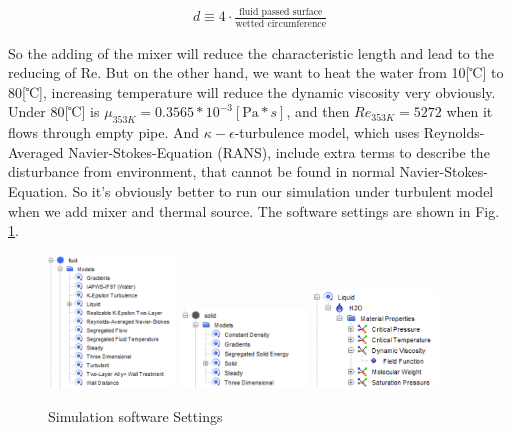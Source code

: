 \documentclass[journal,article,submit,moreauthors,pdftex]{Definitions/mdpi}
\begin{document}
\begin{align*}
    d \equiv 4 \cdot \frac{\text{fluid passed surface}}{\text{wetted circumference}}
\end{align*}

So the adding of the mixer will reduce the characteristic length and lead to the reducing of Re. But on the other hand, we want to heat the water from 10[℃] to 80[℃], increasing temperature will reduce the dynamic viscosity very obviously. Under 80[℃] is  $\mu_{353K}=0.3565*10^{-3}[\text{Pa}*s]$, and then $Re_{353K}=5272$ when it flows through empty pipe. And $\kappa-\epsilon$-turbulence model, which uses Reynolds-Averaged Navier-Stokes-Equation (RANS), include extra terms to describe the disturbance from environment, that cannot be found in normal Navier-Stokes-Equation. So it's obviously better to run our simulation under turbulent model when we add mixer and thermal source. The software settings are shown in Fig. \ref{software-settings}.

\begin{figure}
\begin{center}
\centerline{\includegraphics[width=0.3\textwidth]{./docu_pictures/software1.png} \includegraphics[width=0.3\textwidth]{./docu_pictures/software2.png}
\includegraphics[width=0.3\textwidth]{./docu_pictures/software3.png}}
\end{center}
\caption{Simulation software Settings}
\label{software-settings}
\end{figure}
\end{document}
